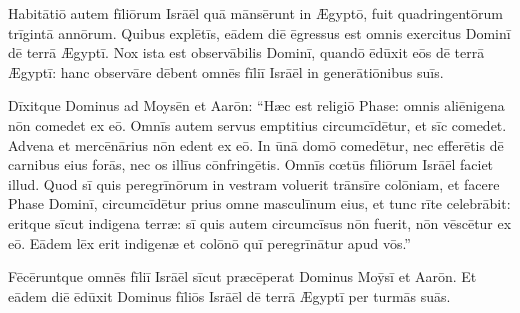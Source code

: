 Habitātiō
autem fīliōrum Isrāēl quā mānsērunt in Ægyptō, fuit quadringentōrum
trīgintā annōrum. Quibus explētīs, eādem diē
ēgressus est omnis exercitus Dominī dē terrā Ægyptī. Nox ista est
observābilis Dominī, quandō ēdūxit eōs dē terrā Ægyptī: hanc
observāre dēbent omnēs fīliī Isrāēl in generātiōnibus suīs.

Dīxitque Dominus ad Moysēn et Aarōn: ``Hæc est religiō Phase: omnis
aliēnigena nōn comedet ex eō. Omnīs autem servus
emptitius circumcīdētur, et sīc comedet. Advena et
mercēnārius nōn edent ex eō. In ūnā domō comedētur, nec
efferētis dē carnibus eius forās, nec os illīus
cōnfringētis. Omnīs cœtūs fīliōrum
Isrāēl faciet illud. Quod sī quis peregrīnōrum in
vestram voluerit trānsīre colōniam, et facere Phase Dominī,
circumcīdētur prius omne masculīnum eius, et tunc rīte
celebrābit: eritque sīcut indigena terræ:
sī quis autem circumcīsus nōn fuerit, nōn
vēscētur ex eō. Eādem lēx erit indigenæ
et colōnō quī peregrīnātur apud vōs.''

Fēcēruntque omnēs
fīliī Isrāēl sīcut præcēperat Dominus Moȳsī et Aarōn. Et eādem diē
ēdūxit Dominus fīliōs Isrāēl dē terrā Ægyptī per turmās
suās. 
